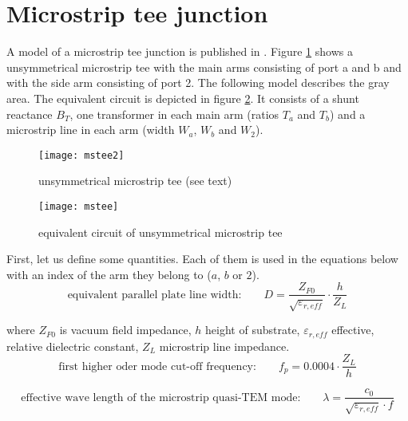 \section{Microstrip tee junction}

A model of a microstrip tee junction is published in
\cite{Hammerstad2}.  Figure \ref{fig:mstee2} shows a unsymmetrical
microstrip tee with the main arms consisting of port a and b and with
the side arm consisting of port 2.  The following model describes the
gray area.  The equivalent circuit is depicted in figure
\ref{fig:mstee}.  It consists of a shunt reactance $B_T$, one
transformer in each main arm (ratios $T_a$ and $T_b$) and a microstrip
line in each arm (width $W_a$, $W_b$ and $W_2$).

\begin{figure}[ht]
\begin{center}
\texttt{[image: mstee2]}
\end{center}
\caption{unsymmetrical microstrip tee (see text)}
\label{fig:mstee2}
\end{figure}
\FloatBarrier

\begin{figure}[ht]
\begin{center}
\texttt{[image: mstee]}
\end{center}
\caption{equivalent circuit of unsymmetrical microstrip tee}
\label{fig:mstee}
\end{figure}
\FloatBarrier

First, let us define some quantities.  Each of them is used in the
equations below with an index of the arm they belong to ($a$, $b$ or
$2$).
\begin{equation}
\text{equivalent parallel plate line width:}\qquad
  D = \frac{Z_{F0}}{\sqrt{\varepsilon_{r,eff}}} \cdot \frac{h}{Z_L}
\end{equation}

where $Z_{F0}$ is vacuum field impedance, $h$ height of substrate,
$\varepsilon_{r,eff}$ effective, relative dielectric constant, $Z_L$
microstrip line impedance.
\begin{equation}
\text{first higher oder mode cut-off frequency:}\qquad  f_p = 0.0004\cdot\frac{Z_L}{h}
\end{equation}

\begin{equation}
\text{effective wave length of the microstrip quasi-TEM mode:}\qquad
  \lambda = \frac{c_0}{\sqrt{\varepsilon_{r,eff}}\cdot f}
\end{equation}

